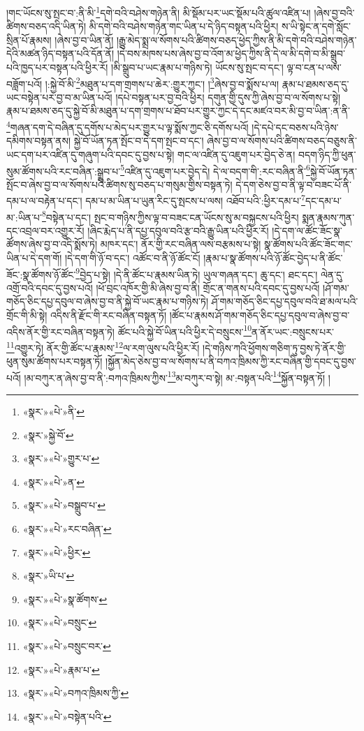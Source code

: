 །གང་ཡོངས་སུ་སྤང་བ་:ནི་མི་\footnote{«སྣར་»«པེ་»ནི་}དགེ་བའི་བཤེས་གཉེན་ནི། མི་སྡོམ་པར་ཡང་སྡོམ་པའི་ཚུལ་འཛིན་པ། །ཞེས་བྱ་བའི་ཚིགས་བཅད་འདི་ཡིན་ཏེ། མི་དགེ་བའི་བཤེས་གཉེན་གང་ཡིན་པ་དེ་ཉིད་བསྟན་པའི་ཕྱིར། ས་ཡི་སྟེང་ན་དགེ་སློང་སྲིན་པོ་རྣམས། །ཞེས་བྱ་བ་ཡིན་ནོ། །རྒྱུ་མེད་སྨྲ་ལ་སོགས་པའི་ཚིགས་བཅད་ཕྱེད་ཀྱིས་ནི་མི་དགེ་བའི་བཤེས་གཉེན་དེའི་མཚན་ཉིད་བསྟན་པའི་དོན་ནོ། །དེ་བས་མཁས་པས་ཞེས་བྱ་བ་འོག་མ་ཕྱེད་ཀྱིས་ནི་དེ་ལ་མི་དགེ་བ་མི་སྒྲུབ་པའི་ཁྱད་པར་བསྟན་པའི་ཕྱིར་རོ། །མི་སྒྲུབ་པ་ཡང་རྣམ་པ་གཉིས་ཏེ། ཡོངས་སུ་སྤང་བ་དང་། ལྟ་བ་ངན་པ་ལས་བཟློག་པའོ། །:སྐྱེ་བོ་མི་\footnote{«སྣར་»སྐྱེ་བོ་}མཐུན་པ་དག་གྲགས་པ་ཆེར་:གྱུར་ཀྱང་། །\footnote{«སྣར་»«པེ་»གྱུར་པ་}ཞེས་བྱ་བ་སྨོས་པ་ལ། རྣམ་པ་ཐམས་ཅད་དུ་ཡང་བསྟེན་པར་བྱ་བ་མ་ཡིན་པའོ། །དཔེ་བསྟན་པར་བྱ་བའི་ཕྱིར། དགུན་གྱི་དུས་ཀྱི་ཞེས་བྱ་བ་ལ་སོགས་པ་སྟེ། རྣམ་པ་ཐམས་ཅད་དུ་སྐྱེ་བོ་མི་མཐུན་པ་དག་གྲགས་པ་ཐོབ་པར་གྱུར་ཀྱང་དེ་དང་མཛའ་བར་མི་བྱ་བ་ཡིན་:ན་ནི་\footnote{«སྣར་»«པེ་»ན་}གཞན་དག་དེ་བཞིན་དུ་དགོས་པ་མེད་པར་གྱུར་པ་ལྟ་སྨོས་ཀྱང་ཅི་དགོས་པའོ། །དེ་དཔེ་དང་བཅས་པའི་ཉེས་དམིགས་བསྟན་ནས། སྐྱེ་བོ་ཡོན་ཏན་སྤོང་བ་དེ་དག་སྤང་བ་དང་། ཞེས་བྱ་བ་ལ་སོགས་པའི་ཚིགས་བཅད་བཅུས་ནི་ཡང་དག་པར་འཛིན་དུ་གཞུག་པའི་དབང་དུ་བྱས་པ་སྟེ། གང་ལ་འཛིན་དུ་འཇུག་པར་བྱེད་ཅེ་ན། བདག་ཉིད་ཀྱི་ཕུན་སུམ་ཚོགས་པའི་རང་བཞིན་:སྒྲུབ་པ་\footnote{«སྣར་»«པེ་»བསྒྲུབ་པ་}འཛིན་དུ་འཇུག་པར་བྱེད་དེ། དེ་ལ་བདག་གི་:རང་བཞིན་ནི་\footnote{«སྣར་»«པེ་»རང་བཞིན་}སྐྱེ་བོ་ཡོན་ཏན་སྤོང་བ་ཞེས་བྱ་བ་ལ་སོགས་པའི་ཚིགས་སུ་བཅད་པ་གསུམ་གྱིས་བསྟན་ཏེ། དེ་དག་ཅེས་བྱ་བ་ནི་ལྟ་བ་བཟང་པོ་ནི་དམ་པ་ལ་བརྟེན་པ་དང་། དམ་པ་མ་ཡིན་པ་ཡུན་རིང་དུ་སྤངས་པ་ལས། འཐོབ་པའི་:ཕྱིར་དམ་པ་\footnote{«སྣར་»«པེ་»ཕྱིར་}དང་དམ་པ་མ་:ཡིན་པ་\footnote{«སྣར་»ཡི་པ་}བསྟེན་པ་དང་། སྤང་བ་གཉིས་ཀྱིས་ལྟ་བ་བཟང་ངན་ཡོངས་སུ་མ་བསྐྱངས་པའི་ཕྱིར། སྨན་རྣམས་ཀུན་དང་འབྲལ་བར་འགྱུར་རོ། །ཞིང་རྨེད་པ་ནི་དཔྱ་དབུལ་བའི་རྩ་བའི་རྒྱུ་ཡིན་པའི་ཕྱིར་རོ། །དེ་དག་ལ་ཚོང་ཟོང་སྣ་ཚོགས་ཞེས་བྱ་བ་འདི་སྨོས་ཏེ། མཁར་དང་། ནོར་གྱི་རང་བཞིན་ལས་བརྩམས་པ་སྟེ། སྣ་ཚོགས་པའི་ཚོང་ཟོང་གང་ཡིན་པ་དེ་དག་གོ། །དེ་དག་གི་ཉོ་བ་དང་། འཚོང་བ་ནི་ཉོ་ཚོང་ངོ། །རྣམ་པ་སྣ་ཚོགས་པའི་ཉོ་ཚོང་བྱེད་པ་ནི་ཚོང་ཟོང་:སྣ་ཚོགས་ཉོ་ཚོང་\footnote{«སྣར་»«པེ་»སྣ་ཚོགས་}བྱེད་པ་སྟེ། །དེ་ནི་ཚོང་པ་རྣམས་ཡིན་ཏེ། ཡུལ་གཞན་དང་། ཆུ་དང་། ཐང་དང་། ལེན་དུ་འགྲོ་བའི་དབང་དུ་བྱས་པའོ། །ཕོ་བྲང་འཁོར་གྱི་མི་ཞེས་བྱ་བ་ནི། གྲོང་ན་གནས་པའི་དབང་དུ་བྱས་པའོ། །ཤོ་གམ་གཅོད་ཅིང་དཔྱ་དབུལ་བ་ཞེས་བྱ་བ་ནི་སྐྱེ་བོ་ཡང་རྣམ་པ་གཉིས་ཏེ། ཤོ་གམ་གཅོད་ཅིང་དཔྱ་དབུལ་བའི་ཐ་མལ་པའི་གྲོང་གི་མི་སྟེ། འདིས་ནི་རྫོང་གི་རང་བཞིན་བསྟན་ཏོ། །ཚོང་པ་རྣམས་ཤོ་གམ་གཅོད་ཅིང་དཔྱ་དབུལ་བ་ཞེས་བྱ་བ་འདིས་ནོར་གྱི་རང་བཞིན་བསྟན་ཏེ། ཚོང་པའི་སྐྱེ་བོ་ཡིན་པའི་ཕྱིར་དེ་བསྲུངས་\footnote{«སྣར་»«པེ་»བསྲུང་}ན་ནོར་ཡང་:བསྲུངས་པར་\footnote{«སྣར་»«པེ་»བསྲུང་བར་}འགྱུར་ཏེ། ནོར་གྱི་ཚོང་པ་རྣམས་\footnote{«སྣར་»«པེ་»རྣམ་པ་}ལ་རག་ལུས་པའི་ཕྱིར་རོ། །དེ་གཉིས་ཀའི་ཕྱོགས་གཅིག་ཏུ་བྱས་ཏེ་ནོར་གྱི་ཕུན་སུམ་ཚོགས་པར་བསྟན་ཏོ། །སྐྱོན་མེད་ཅེས་བྱ་བ་ལ་སོགས་པ་ནི་བཀའ་ཁྲིམས་ཀྱི་རང་བཞིན་གྱི་དབང་དུ་བྱས་པའོ། །མ་བཀུར་ན་ཞེས་བྱ་བ་ནི་:བཀའ་ཁྲིམས་ཀྱིས་\footnote{«སྣར་»«པེ་»བཀའ་ཁྲིམས་ཀྱི་}མ་བཀུར་བ་སྟེ། མ་:བསྟན་པའི་\footnote{«སྣར་»«པེ་»བསྟེན་པའི་}སྐྱོན་བསྟན་ཏོ། །
